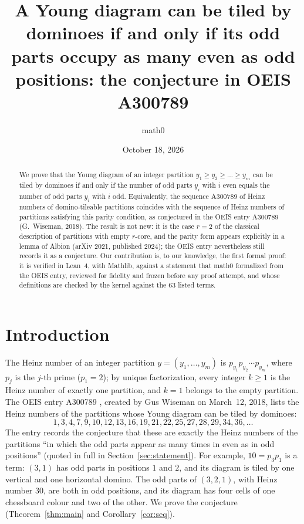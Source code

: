 \documentclass[11pt]{amsart}
\title[Domino-tileable Young diagrams (OEIS A300789)]{A Young diagram can be tiled by dominoes if and only if its odd parts occupy as many even as odd positions: the conjecture in OEIS A300789}
\author{math0}
\date{October 18, 2026}
\theoremstyle{plain}
\theoremstyle{definition}
\begin{document}
\begin{abstract}
We prove that the Young diagram of an integer partition $y_1\ge y_2\ge\dots\ge y_m$ can be tiled by dominoes if and only if the number of odd parts $y_i$ with $i$ even equals the number of odd parts $y_i$ with $i$ odd.
Equivalently, the sequence A300789 of Heinz numbers of domino-tileable partitions coincides with the sequence of Heinz numbers of partitions satisfying this parity condition, as conjectured in the OEIS entry A300789 (G.~Wiseman, 2018).
The result is not new: it is the case $r=2$ of the classical description of partitions with empty $r$-core, and the parity form appears explicitly in a lemma of Albion (arXiv 2021, published 2024); the OEIS entry nevertheless still records it as a conjecture.
Our contribution is, to our knowledge, the first formal proof: it is verified in Lean~4, with Mathlib, against a statement that math0 formalized from the OEIS entry, reviewed for fidelity and frozen before any proof attempt, and whose definitions are checked by the kernel against the $63$ listed terms.
\end{abstract}
\maketitle

\section{Introduction}

The Heinz number of an integer partition $y=(y_1,\dots,y_m)$ is $p_{y_1}p_{y_2}\cdots p_{y_m}$, where $p_j$ is the $j$-th prime ($p_1=2$); by unique factorization, every integer $k\ge1$ is the Heinz number of exactly one partition, and $k=1$ belongs to the empty partition.
The OEIS entry A300789 \cite{A300789}, created by Gus Wiseman on March~12, 2018, lists the Heinz numbers of the partitions whose Young diagram can be tiled by dominoes:
\[
1,3,4,7,9,10,12,13,16,19,21,22,25,27,28,29,34,36,\dots
\]
The entry records the conjecture that these are exactly the Heinz numbers of the partitions ``in which the odd parts appear as many times in even as in odd positions'' (quoted in full in Section~\ref{sec:statement}).
For example, $10=p_3p_1$ is a term: $(3,1)$ has odd parts in positions $1$ and $2$, and its diagram is tiled by one vertical and one horizontal domino. The odd parts of $(3,2,1)$, with Heinz number $30$, are both in odd positions, and its diagram has four cells of one chessboard colour and two of the other.
We prove the conjecture (Theorem~\ref{thm:main} and Corollary~\ref{cor:seq}).
\end{document}
